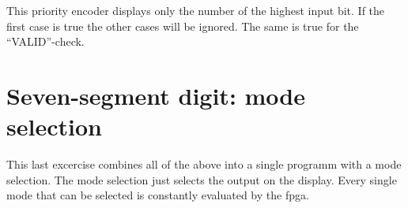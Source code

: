 This priority encoder displays only the number of the highest input bit. If the first case is true the other cases will be ignored. The same is true for the ``VALID''-check. 



\section{Seven-segment digit: mode selection}

This last excercise combines all of the above into a single programm with a mode selection. The mode selection just selects the output on the display. Every single mode that can be selected is constantly evaluated by the \gls{fpga}. 


